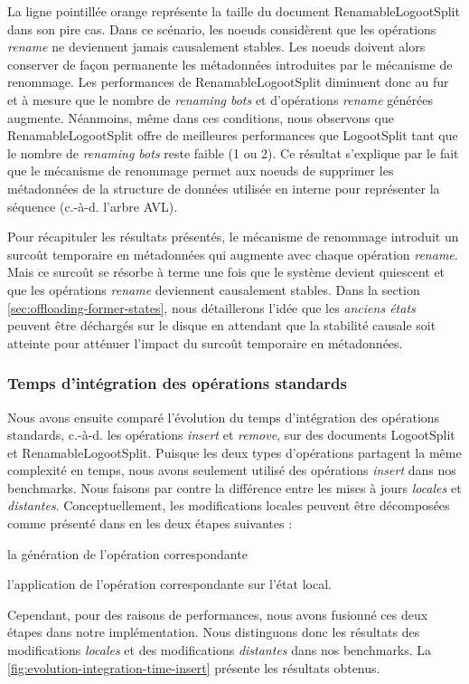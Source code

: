 \documentclass[12pt]{thesul}
\newcommand{\ie}{c.-à-d. }
\begin{document}
La ligne pointillée orange représente la taille du document RenamableLogootSplit dans son pire cas.
Dans ce scénario, les noeuds considèrent que les opérations \emph{rename} ne deviennent jamais causalement stables.
Les noeuds doivent alors conserver de façon permanente les métadonnées introduites par le mécanisme de renommage.
Les performances de RenamableLogootSplit diminuent donc au fur et à mesure que le nombre de \emph{renaming bots} et d'opérations \emph{rename} générées augmente.
Néanmoins, même dans ces conditions, nous observons que RenamableLogootSplit offre de meilleures performances que LogootSplit tant que le nombre de \emph{renaming bots} reste faible (1 ou 2).
Ce résultat s'explique par le fait que le mécanisme de renommage permet aux noeuds de supprimer les métadonnées de la structure de données utilisée en interne pour représenter la séquence (\ie l'arbre AVL).

Pour récapituler les résultats présentés, le mécanisme de renommage introduit un surcoût temporaire en métadonnées qui augmente avec chaque opération \emph{rename}.
Mais ce surcoût se résorbe à terme une fois que le système devient quiescent et que les opérations \emph{rename} deviennent causalement stables.
Dans la section \autoref{sec:offloading-former-states}, nous détaillerons l'idée que les \emph{anciens états} peuvent être déchargés sur le disque en attendant que la stabilité causale soit atteinte pour atténuer l'impact du surcoût temporaire en métadonnées.

\subsubsection{Temps d'intégration des opérations standards}

Nous avons ensuite comparé l'évolution du temps d'intégration des opérations standards, \ie les opérations \emph{insert} et \emph{remove}, sur des documents LogootSplit et RenamableLogootSplit.
Puisque les deux types d'opérations partagent la même complexité en temps, nous avons seulement utilisé des opérations \emph{insert} dans nos benchmarks.
Nous faisons par contre la différence entre les mises à jours \emph{locales} et \emph{distantes}.
Conceptuellement, les modifications locales peuvent être décomposées comme présenté dans \cite{baquero2017pure} en les deux étapes suivantes :
\begin{enumerate*}[label=(\roman*)]
  \item la génération de l'opération correspondante
  \item l'application de l'opération correspondante sur l'état local.
\end{enumerate*}
Cependant, pour des raisons de performances, nous avons fusionné ces deux étapes dans notre implémentation.
Nous distinguons donc les résultats des modifications \emph{locales} et des modifications \emph{distantes} dans nos benchmarks.
La \autoref{fig:evolution-integration-time-insert} présente les résultats obtenus.
\end{document}
